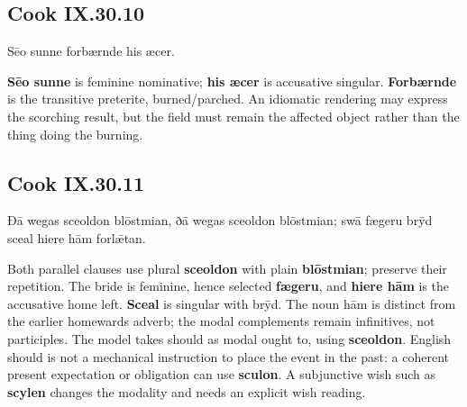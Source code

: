 \subsection*{Cook IX.30.10}

\par\begin{minipage}{\linewidth}\raggedright
Sēo sunne forbærnde his æcer.

\textbf{Sēo sunne} is feminine nominative; \textbf{his æcer} is accusative singular. \textbf{Forbærnde} is the transitive preterite, burned/\allowbreak{}parched. An idiomatic rendering may express the scorching result, but the field must remain the affected object rather than the thing doing the burning.

\end{minipage}\par\addvspace{4pt}

\subsection*{Cook IX.30.11}

\par\begin{minipage}{\linewidth}\raggedright
Ðā wegas sceoldon blōstmian, ðā wegas sceoldon blōstmian; swā fægeru brȳd sceal hiere hām forlǣtan.

Both parallel clauses use plural \textbf{sceoldon} with plain \textbf{blōstmian}; preserve their repetition. The bride is feminine, hence selected \textbf{fægeru}, and \textbf{hiere hām} is the accusative home left. \textbf{Sceal} is singular with brȳd. The noun hām is distinct from the earlier homewards adverb; the modal complements remain infinitives, not participles. The model takes should as modal ought to, using \textbf{sceoldon}. English should is not a mechanical instruction to place the event in the past: a coherent present expectation or obligation can use \textbf{sculon}. A subjunctive wish such as \textbf{scylen} changes the modality and needs an explicit wish reading.

\end{minipage}\par\addvspace{4pt}

